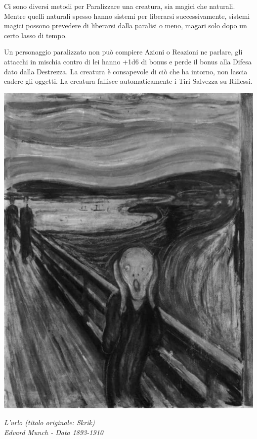 \begin{multicols}{2}
Ci sono diversi metodi per Paralizzare una creatura, sia magici che naturali. Mentre quelli naturali spesso hanno sistemi per liberarsi successivamente, sistemi magici possono prevedere di liberarsi dalla paralisi o meno, magari solo dopo un certo lasso di tempo.

Un personaggio paralizzato non può compiere Azioni o Reazioni ne parlare, gli attacchi in mischia contro di lei hanno +1d6 di bonus e perde il bonus alla Difesa dato dalla Destrezza. La creatura è consapevole di ciò che ha intorno, non lascia cadere gli oggetti. La creatura fallisce automaticamente i Tiri Salvezza su Riflessi. 

\end{multicols}

\vfill

\begin{center}
\includegraphics[width=0.45\linewidth]{immagini/the-scream.png}

\emph{L'urlo (titolo originale: Skrik)\\ Edvard Munch - Data 1893-1910}
\end{center}

\pagebreak

